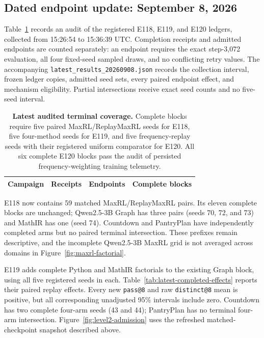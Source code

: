 \documentclass{article}
\newcommand{\1}{\mathbf 1}
\theoremstyle{remark}
\theoremstyle{definition}
\theoremstyle{plain}
\begin{document}
\subsection{Dated endpoint update: September 8, 2026}
\label{app:latest-results-update}

Table~\ref{tab:latest-results-update} records an audit of the registered
E118, E119, and E120 ledgers, collected from 15:26:54 to 15:36:39 UTC.
Completion receipts and admitted endpoints are counted separately: an endpoint
requires the exact step-3,072 evaluation, all four fixed-seed sampled draws,
and no conflicting retry values. The accompanying
\texttt{latest\_results\_20260908.json} records the collection interval,
frozen ledger copies, admitted seed sets, every paired endpoint effect, and
mechanism eligibility. Partial intersections receive exact seed counts and
no five-seed interval.

\begin{table}[H]
  \centering
  \caption{\textbf{Latest audited terminal coverage.}
  Complete blocks require five paired MaxRL/ReplayMaxRL seeds for E118,
  five four-method seeds for E119, and five frequency-replay seeds with
  their registered uniform comparator for E120. All six complete E120 blocks
  pass the audit of persisted frequency-weighting training telemetry.}
  \label{tab:latest-results-update}
  \small
  \setlength{\tabcolsep}{5pt}
  \begin{tabular}{@{}lrrr@{}}
    \toprule
    \textbf{Campaign} & \textbf{Receipts} & \textbf{Endpoints}
      & \textbf{Complete blocks} \\
    \midrule
    
  \end{tabular}
\end{table}

E118 now contains 59 matched MaxRL/ReplayMaxRL pairs. Its eleven complete
blocks are unchanged; Qwen2.5-3B Graph has three pairs (seeds 70, 72, and 73)
and MathIR has one (seed 74). Countdown and PantryPlan have independently
completed arms but no paired terminal intersection. These prefixes remain
descriptive, and the incomplete Qwen2.5-3B MaxRL grid is not averaged across
domains in Figure~\ref{fig:maxrl-factorial}.

E119 adds complete Python and MathIR factorials to the existing Graph block,
using all five registered seeds in each. Table~\ref{tab:latest-completed-effects}
reports their paired replay effects. Every new \texttt{pass@8} and raw
\texttt{distinct@8} mean is positive, but all corresponding unadjusted 95\%
intervals include zero. Countdown has two complete four-arm seeds (43 and 44);
PantryPlan has no terminal four-arm intersection. Figure~\ref{fig:level2-admission}
uses the refreshed matched-checkpoint snapshot described above.
\end{document}
